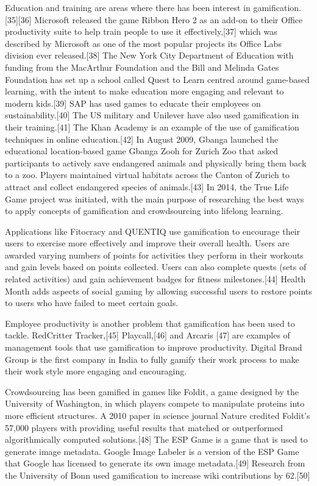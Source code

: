 Education and training are areas where there has been interest in gamification.[35][36] Microsoft released the game Ribbon Hero 2 as an add-on to their Office productivity suite to help train people to use it effectively,[37] which was described by Microsoft as one of the most popular projects its Office Labs division ever released.[38] The New York City Department of Education with funding from the MacArthur Foundation and the Bill and Melinda Gates Foundation has set up a school called Quest to Learn centred around game-based learning, with the intent to make education more engaging and relevant to modern kids.[39] SAP has used games to educate their employees on sustainability.[40] The US military and Unilever have also used gamification in their training.[41] The Khan Academy is an example of the use of gamification techniques in online education.[42] In August 2009, Gbanga launched the educational location-based game Gbanga Zooh for Zurich Zoo that asked participants to actively save endangered animals and physically bring them back to a zoo. Players maintained virtual habitats across the Canton of Zurich to attract and collect endangered species of animals.[43] In 2014, the True Life Game project was initiated, with the main purpose of researching the best ways to apply concepts of gamification and crowdsourcing into lifelong learning.

Applications like Fitocracy and QUENTIQ use gamification to encourage their users to exercise more effectively and improve their overall health. Users are awarded varying numbers of points for activities they perform in their workouts and gain levels based on points collected. Users can also complete quests (sets of related activities) and gain achievement badges for fitness milestones.[44] Health Month adds aspects of social gaming by allowing successful users to restore points to users who have failed to meet certain goals.

Employee productivity is another problem that gamification has been used to tackle. RedCritter Tracker,[45] Playcall,[46] and Arcaris [47] are examples of management tools that use gamification to improve productivity. Digital Brand Group is the first company in India to fully gamify their work process to make their work style more engaging and encouraging.

Crowdsourcing has been gamified in games like Foldit, a game designed by the University of Washington, in which players compete to manipulate proteins into more efficient structures. A 2010 paper in science journal Nature credited Foldit's 57,000 players with providing useful results that matched or outperformed algorithmically computed solutions.[48] The ESP Game is a game that is used to generate image metadata. Google Image Labeler is a version of the ESP Game that Google has licensed to generate its own image metadata.[49] Research from the University of Bonn used gamification to increase wiki contributions by 62.[50]

